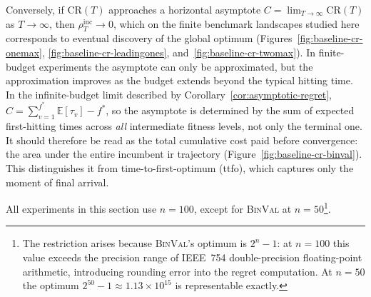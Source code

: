 Conversely, if $\mathrm{CR}(T)$ approaches a horizontal asymptote
$C = \lim_{T \to \infty} \mathrm{CR}(T)$ as $T \to \infty$, then
$\rho_T^{\mathrm{inc}} \to 0$, which on the finite benchmark
landscapes studied here corresponds to eventual discovery of the
global optimum (Figures~\ref{fig:baseline-cr-onemax},
\ref{fig:baseline-cr-leadingones}, and~\ref{fig:baseline-cr-twomax}).
In finite-budget experiments the
asymptote can only be
approximated, but the approximation improves as the budget extends
beyond the typical hitting time. In the infinite-budget limit described by
Corollary~\ref{cor:asymptotic-regret},
$C = \sum_{v=1}^{f^{*}} \mathbb{E}[\tau_v] - f^{*}$, so the
asymptote is determined by the sum of expected first-hitting times
across \emph{all} intermediate fitness levels, not only the terminal
one. It should therefore be read as the total cumulative cost paid
before convergence: the area under the entire incumbent \acrshort{ir}
trajectory (Figure~\ref{fig:baseline-cr-binval}). This distinguishes
it from time-to-first-optimum
(\acrshort{ttfo}), which captures only the moment of final arrival.

All experiments in this section use $n = 100$, except for
\textsc{BinVal} at $n = 50$\footnote{The restriction arises because
  \textsc{BinVal}'s optimum is $2^n - 1$: at $n = 100$ this value
  exceeds the precision range of IEEE~754 double-precision
  floating-point arithmetic, introducing rounding error into the regret
  computation. At $n = 50$ the optimum $2^{50} - 1 \approx 1.13 \times
10^{15}$ is representable exactly.}.

